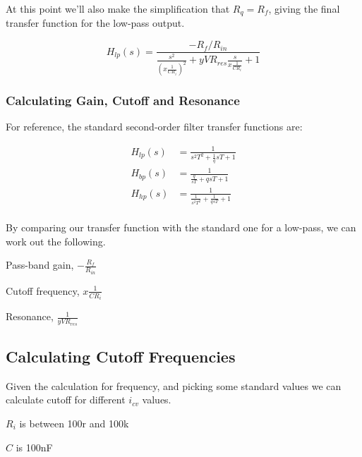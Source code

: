 \documentclass{article}
\begin{document}
At this point we'll also make the simplification that $R_q = R_{f}$, giving the final transfer function for the low-pass output.

\begin{equation}
  H_{lp}(s) = \frac{-R_{f}/R_{in}}{\frac{s^2}{{(x\frac{1}{CR_{i}})}^2} + yVR_{res}\frac{s}{x\frac{1}{CR_{i}}} + 1 }
\end{equation}

\subsubsection{Calculating Gain, Cutoff and Resonance}

For reference, the standard second-order filter transfer functions are:

\begin{equation*}
\begin{split}
  H_{lp}(s) & = \frac{1}{s^2T^2 + \frac{1}{q}sT + 1} \\
  H_{bp}(s) & = \frac{1}{\frac{q}{sT} + qsT + 1} \\
  H_{hp}(s) & = \frac{1}{\frac{1}{s^2T^2} + \frac{1}{qsT} + 1} \\
\end{split}
\end{equation*}

By comparing our transfer function with the standard one for a low-pass, we can work out the following.

\begin{description}
  \item Pass-band gain, $-\frac{R_{f}}{R_{in}}$
  \item Cutoff frequency, $x\frac{1}{CR_{i}}$
  \item Resonance, $\frac{1}{yVR_{res}}$
\end{description}

\subsection{Calculating Cutoff Frequencies}

Given the calculation for frequency, and picking some standard values we can calculate cutoff for different $i_{cv}$ values.

\begin{description}
  \item $R_i$ is between 100r and 100k
  \item $C$ is 100nF
\end{description}
\end{document}
